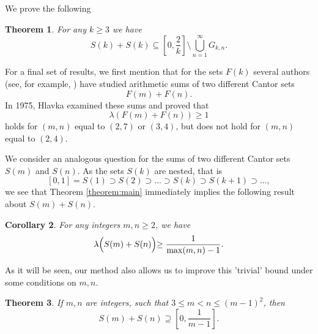 \documentclass{amsart}
\newtheorem{theorem}{Theorem}[section]
\newtheorem{corollary}[theorem]{Corollary}
\theoremstyle{definition}
\newcommand{\0}{\mbf 0}%
\renewcommand{\text}{\textup}
\begin{document}




We prove the following
\begin{theorem}\label{prop:gaps}
    For any $k\geq3$ we have
$$
S(k)+S(k) \subseteq \left[0,\frac2k\right] \setminus \bigcup_{n=1}^\infty G_{k,n}.
$$

\end{theorem}


For a final set of results, we first mention that for the sets $F(k)$ several authors (see, for example, \cite{MR1876272,MR1866013,MR0376545}) have studied arithmetic sums of two different Cantor sets
$$
F(m)+F(n).
$$
In 1975, Hlavka \cite{MR0376545} examined these sums and proved that
$$
\lambda \left(F(m)+F(n)\right)\geq1
$$
holds for $(m, n)$ equal to $(2, 7)$ or $(3, 4)$, but does not hold for $(m, n)$ equal
to $(2, 4)$. 

We consider an analogous question for the sums of two different Cantor sets $S(m)$ and $S(n)$. As the sets $S(k)$ are nested, that is
$$
[0,1]=S(1)\supset S(2)\supset\ldots\supset S(k)\supset S(k+1)\supset\ldots,
$$
we see that Theorem \ref{theorem:main} immediately implies the following result about $S(m)+S(n)$.
\begin{corollary}
    For any integers $m,n\geq2$, we have
    $$
 \lambda\Bigl( S(m)+S(n) \Bigl)\geq \frac{1}{\max(m,n)-1}.
 $$
\end{corollary}

As it will be seen, our method also allows us to improve this 'trivial' bound under some conditions on $m,n$.
\begin{theorem}\label{main:theorem2}
    If $m,n$ are integers, such that 
$3 \leq m < n\leq (m-1)^2$, then
$$ 
S(m)+S(n) \supseteq  \left[0, \frac{1}{m-1}\right].
$$
\end{theorem}
\end{document}
